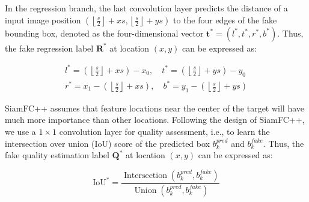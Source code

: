 \documentclass[journal]{IEEEtran}
\newcommand{\ie}{i.e.}
\begin{document}
In the regression branch, the last convolution layer predicts the distance of a input image position $\left(\left\lfloor\frac{s}{2}\right\rfloor+x s,\left\lfloor\frac{s}{2}\right\rfloor+y s\right)$ to the four edges of the fake bounding box, denoted as the four-dimensional vector $\boldsymbol{t}^{*}=\left(l^{*}, t^{*}, r^{*}, b^{*}\right)$. Thus, the fake regression label $\textbf{R}^*$ at location $(x,y)$ can be expressed as:

\begin{equation}
  \begin{array}{ll}
  l^{*}=\left(\left\lfloor\frac{s}{2}\right\rfloor+x s\right)-x_{0}, \quad t^{*}=\left(\left\lfloor\frac{s}{2}\right\rfloor+y s\right)-y_{0} \\
  r^{*}=x_{1}-\left(\left\lfloor\frac{s}{2}\right\rfloor+x s\right), \quad b^{*}=y_{1}-\left(\left\lfloor\frac{s}{2}\right\rfloor+y s\right)
  \end{array}
\end{equation}

SiamFC++ assumes that feature locations near the center of the target will have much more importance than other locations. Following the design of SiamFC++, we use a $1 \times 1$ convolution layer for quality assessment, \ie, to learn the intersection over union (IoU) score of the predicted box $b^{pred}_k$ and $b^{fake}_k$. Thus, the fake quality estimation label $\textbf{Q}^*$ at location $(x,y)$ can be expressed as:

\begin{equation}
  \mathrm{IoU}^{*}=\frac{\operatorname{ Intersection }\left(b^{pred}_k, b^{fake}_k\right)}{\operatorname{Union}\left(b^{pred}_k, b^{fake}_k\right)}
\end{equation}
\end{document}
